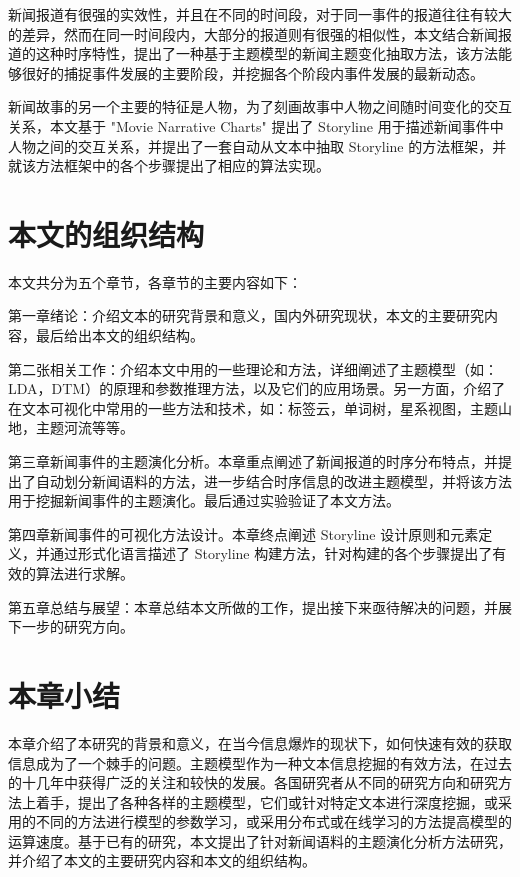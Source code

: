 新闻报道有很强的实效性，并且在不同的时间段，对于同一事件的报道往往有较大的差异，然而在同一时间段内，大部分的报道则有很强的相似性，本文结合新闻报道的这种时序特性，提出了一种基于主题模型的新闻主题变化抽取方法，该方法能够很好的捕捉事件发展的主要阶段，并挖掘各个阶段内事件发展的最新动态。


新闻故事的另一个主要的特征是人物，为了刻画故事中人物之间随时间变化的交互关系，本文基于 "Movie Narrative Charts" \cite{xkcd657} 提出了 Storyline 用于描述新闻事件中人物之间的交互关系，并提出了一套自动从文本中抽取 Storyline 的方法框架，并就该方法框架中的各个步骤提出了相应的算法实现。

\section{本文的组织结构}
本文共分为五个章节，各章节的主要内容如下：


第一章绪论：介绍文本的研究背景和意义，国内外研究现状，本文的主要研究内容，最后给出本文的组织结构。


第二张相关工作：介绍本文中用的一些理论和方法，详细阐述了主题模型（如：LDA，DTM）的原理和参数推理方法，以及它们的应用场景。另一方面，介绍了在文本可视化中常用的一些方法和技术，如：标签云，单词树，星系视图，主题山地，主题河流等等。


第三章新闻事件的主题演化分析。本章重点阐述了新闻报道的时序分布特点，并提出了自动划分新闻语料的方法，进一步结合时序信息的改进主题模型，并将该方法用于挖掘新闻事件的主题演化。最后通过实验验证了本文方法。


第四章新闻事件的可视化方法设计。本章终点阐述 Storyline 设计原则和元素定义，并通过形式化语言描述了 Storyline 构建方法，针对构建的各个步骤提出了有效的算法进行求解。


第五章总结与展望：本章总结本文所做的工作，提出接下来亟待解决的问题，并展下一步的研究方向。

\section{本章小结}
本章介绍了本研究的背景和意义，在当今信息爆炸的现状下，如何快速有效的获取信息成为了一个棘手的问题。主题模型作为一种文本信息挖掘的有效方法，在过去的十几年中获得广泛的关注和较快的发展。各国研究者从不同的研究方向和研究方法上着手，提出了各种各样的主题模型，它们或针对特定文本进行深度挖掘，或采用的不同的方法进行模型的参数学习，或采用分布式或在线学习的方法提高模型的运算速度。基于已有的研究，本文提出了针对新闻语料的主题演化分析方法研究，并介绍了本文的主要研究内容和本文的组织结构。